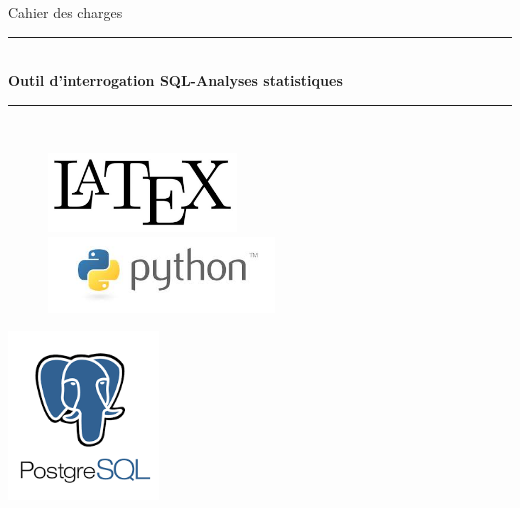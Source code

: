 \documentclass[a4paper]{report}
\newcommand{\HRule}{\rule{\linewidth}{0.5mm}}
\begin{document}
\begin{center}
\LARGE{Cahier des charges} \\

\HRule \\[0.4cm]{
\huge\bfseries Outil d'interrogation SQL-Analyses statistiques \\ [0.4cm]
}
\HRule \\[2cm]


\begin{figure}[htbp]
\begin{minipage}[c]{.45\linewidth}
\begin{flushright}
\includegraphics[width=5cm]{latex.png}\end{flushright}
\end{minipage}
\hfill
\begin{minipage}[c]{.45\linewidth}
\begin{flushleft}
\includegraphics[width=6cm]{python.jpg}
\end{flushleft}
\end{minipage}
\end{figure}
\begin{center}
\includegraphics[width=4cm]{sql.png}
\end{center}



\end{center}
\end{document}
